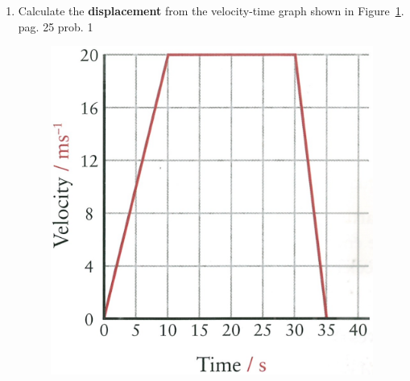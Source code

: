\documentclass[A4,12pt]{article}
\begin{document}
\begin{enumerate}[label=\bfseries (\arabic*)]
\item Calculate the {\bf displacement} from the velocity-time graph shown in Figure~\ref{pag25prob1}.
\cite{ASCCEA} pag. 25 prob. 1\\
%
\begin{figure}[H]
    \centering
    \includegraphics[scale=0.50]{pag25prob1.png}
    \caption{\label{pag25prob1}}
\end{figure}























\end{enumerate}
\end{document}
